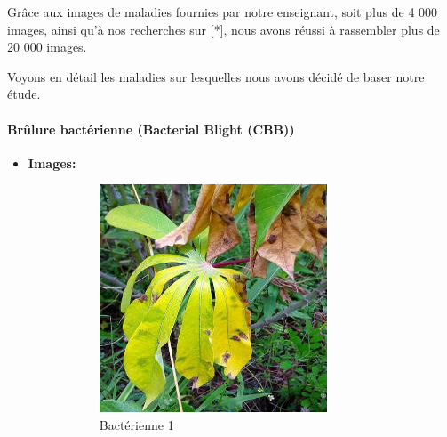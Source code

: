 \documentclass{article}
\begin{document}
		Grâce aux images de maladies fournies par notre enseignant, soit plus de 4 000 images,
		ainsi qu'à nos recherches sur [*], nous avons réussi à rassembler plus de 20 000 images.
		
		Voyons en détail les maladies sur lesquelles nous avons décidé de baser notre étude.
		
		\paragraph{Brûlure bactérienne (Bacterial Blight (CBB))}
		\begin{itemize}
			\item \textbf{Images: }
			\begin{figure}[htbp]
				\centering
				\begin{subfigure}[b]{0.3\textwidth}
					\centering
					\includegraphics[width=\textwidth]{img/1.jpg}
					\caption{Bactérienne 1}
				\end{subfigure}
				\hfill
				\begin{subfigure}[b]{0.3\textwidth}
					\centering

\end{subfigure}
\end{figure}
\end{itemize}
\end{document}
